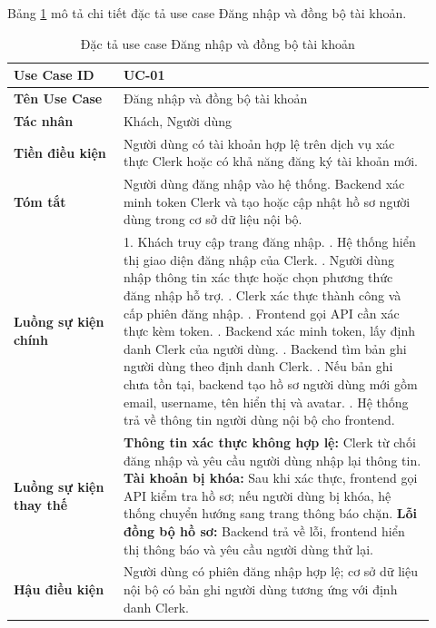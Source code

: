 Bảng \ref{table:2_2} mô tả chi tiết đặc tả use case Đăng nhập và đồng bộ tài khoản.
\begin{table}[h!]
    \caption{Đặc tả use case Đăng nhập và đồng bộ tài khoản}
    \label{table:2_2}
\centering
\small
\renewcommand{\arraystretch}{1.2}
\begin{tabular}{|p{0.24\linewidth}|p{0.68\linewidth}|}
\hline
\textbf{Use Case ID} & UC-01 \\
\hline
\textbf{Tên Use Case} & Đăng nhập và đồng bộ tài khoản \\
\hline
\textbf{Tác nhân} & Khách, Người dùng \\
\hline
\textbf{Tiền điều kiện} & Người dùng có tài khoản hợp lệ trên dịch vụ xác thực Clerk hoặc có khả năng đăng ký tài khoản mới. \\
\hline
\textbf{Tóm tắt} & Người dùng đăng nhập vào hệ thống. Backend xác minh token Clerk và tạo hoặc cập nhật hồ sơ người dùng trong cơ sở dữ liệu nội bộ. \\
\hline
\textbf{Luồng sự kiện chính} &
1. Khách truy cập trang đăng nhập. \newline
2. Hệ thống hiển thị giao diện đăng nhập của Clerk. \newline
3. Người dùng nhập thông tin xác thực hoặc chọn phương thức đăng nhập hỗ trợ. \newline
4. Clerk xác thực thành công và cấp phiên đăng nhập. \newline
5. Frontend gọi API cần xác thực kèm token. \newline
6. Backend xác minh token, lấy định danh Clerk của người dùng. \newline
7. Backend tìm bản ghi người dùng theo định danh Clerk. \newline
8. Nếu bản ghi chưa tồn tại, backend tạo hồ sơ người dùng mới gồm email, username, tên hiển thị và avatar. \newline
9. Hệ thống trả về thông tin người dùng nội bộ cho frontend. \\
\hline
\textbf{Luồng sự kiện thay thế} &
\textbf{Thông tin xác thực không hợp lệ:} Clerk từ chối đăng nhập và yêu cầu người dùng nhập lại thông tin. \newline
\textbf{Tài khoản bị khóa:} Sau khi xác thực, frontend gọi API kiểm tra hồ sơ; nếu người dùng bị khóa, hệ thống chuyển hướng sang trang thông báo chặn. \newline
\textbf{Lỗi đồng bộ hồ sơ:} Backend trả về lỗi, frontend hiển thị thông báo và yêu cầu người dùng thử lại. \\
\hline
\textbf{Hậu điều kiện} & Người dùng có phiên đăng nhập hợp lệ; cơ sở dữ liệu nội bộ có bản ghi người dùng tương ứng với định danh Clerk. \\
\hline
\end{tabular}
\end{table}
\FloatBarrier

